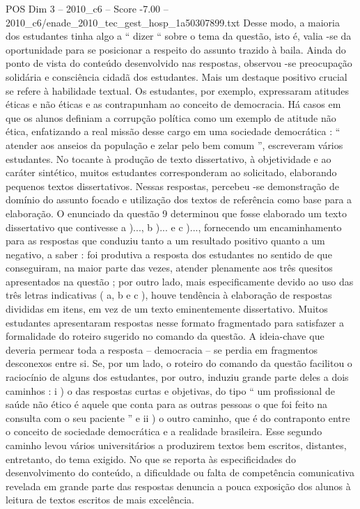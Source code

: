 \begin{textsample}{POS Dim 3 – 2010\_c6 – Score -7.00 – 2010\_c6/enade\_2010\_tec\_gest\_hosp\_1a50307899.txt}
Desse modo, a maioria dos estudantes tinha algo a “ dizer “ sobre o tema da questão, isto é, valia -se da oportunidade para se posicionar a respeito do assunto trazido à baila.
Ainda do ponto de vista do conteúdo desenvolvido nas respostas, observou -se preocupação solidária e consciência cidadã dos estudantes.
Mais um destaque positivo crucial se refere à habilidade textual.
Os estudantes, por exemplo, expressaram atitudes éticas e não éticas e as contrapunham ao conceito de democracia.
Há casos em que os alunos definiam a corrupção política como um exemplo de atitude não ética, enfatizando a real missão desse cargo em uma sociedade democrática : “ atender aos anseios da população e zelar pelo bem comum ”, escreveram vários estudantes.
No tocante à produção de texto dissertativo, à objetividade e ao caráter sintético, muitos estudantes corresponderam ao solicitado, elaborando pequenos textos dissertativos.
Nessas respostas, percebeu -se demonstração de domínio do assunto focado e utilização dos textos de referência como base para a elaboração.
O enunciado da questão 9 determinou que fosse elaborado um texto dissertativo que contivesse a )..., b )... e c )..., fornecendo um encaminhamento para as respostas que conduziu tanto a um resultado positivo quanto a um negativo, a saber : foi produtiva a resposta dos estudantes no sentido de que conseguiram, na maior parte das vezes, atender plenamente aos três quesitos apresentados na questão ; por outro lado, mais especificamente devido ao uso das três letras indicativas ( a, b e c ), houve tendência à elaboração de respostas divididas em itens, em vez de um texto eminentemente dissertativo.
Muitos estudantes apresentaram respostas nesse formato fragmentado para satisfazer a formalidade do roteiro sugerido no comando da questão.
A ideia-chave que deveria permear toda a resposta – democracia – se perdia em fragmentos desconexos entre si.
Se, por um lado, o roteiro do comando da questão facilitou o raciocínio de alguns dos estudantes, por outro, induziu grande parte deles a dois caminhos : i ) o das respostas curtas e objetivas, do tipo “ um profissional de saúde não ético é aquele que conta para as outras pessoas o que foi feito na consulta com o seu paciente ” e ii ) o outro caminho, que é do contraponto entre o conceito de sociedade democrática e a realidade brasileira.
Esse segundo caminho levou vários universitários a produzirem textos bem escritos, distantes, entretanto, do tema exigido.
No que se reporta às especificidades do desenvolvimento do conteúdo, a dificuldade ou falta de competência comunicativa revelada em grande parte das respostas denuncia a pouca exposição dos alunos à leitura de textos escritos de mais excelência.

\end{textsample}

